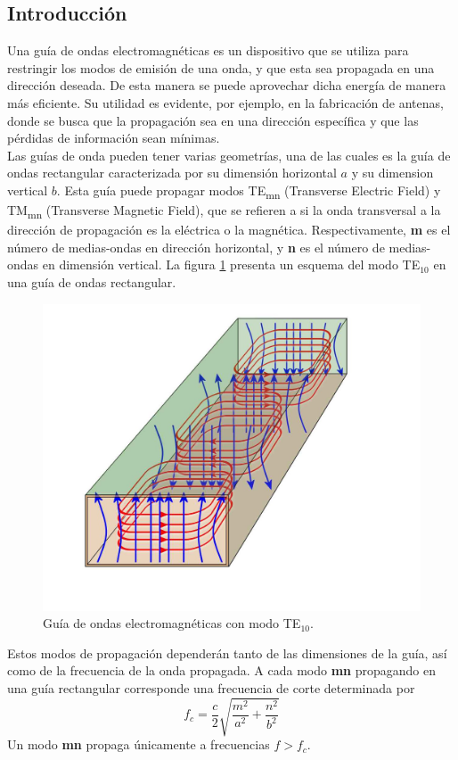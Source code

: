 \documentclass[11pt,a4paper]{article}
\begin{document}
\begin{multicols}{2}
\section{Introducción}
Una guía de ondas electromagnéticas es un dispositivo que se utiliza para restringir los modos de emisión de una onda, y que esta sea propagada en una dirección deseada. De esta manera se puede aprovechar dicha energía de manera más eficiente. Su utilidad es evidente, por ejemplo, en la fabricación de antenas, donde se busca que la propagación sea en una dirección específica y que las pérdidas de información sean mínimas. \\

Las guías de onda pueden tener varias geometrías, una de las cuales es la guía de ondas rectangular caracterizada por su dimensión horizontal $a$ y su dimension vertical $b$. Esta guía puede propagar modos TE\textsubscript{mn} (Transverse Electric Field) y TM\textsubscript{mn} (Transverse Magnetic Field), que se refieren a si la onda transversal a la dirección de propagación es la eléctrica o la magnética. 
Respectivamente, \textbf{m} es el número de medias-ondas en dirección horizontal, y \textbf{n} es el número de medias-ondas en dimensión vertical. 
La figura \ref{fig:te10} presenta un esquema del modo TE$_{10}$ en una guía de ondas rectangular.
\begin{figure}[H]
    \centering
    \includegraphics[scale=0.15]{Images/TE10.jpg}
    \caption{Guía de ondas electromagnéticas con modo TE$_{10}$.}
    \label{fig:te10}
\end{figure}
Estos modos de propagación dependerán tanto de las dimensiones de la guía, así como de la frecuencia de la onda propagada. 
A cada modo \textbf{mn} propagando en una guía rectangular corresponde una frecuencia de corte determinada por
\begin{equation}
    f_c = \frac{c}{2}\sqrt{\frac{m^2}{a^2}+\frac{n^2}{b^2}}
\end{equation}
Un modo \textbf{mn} propaga únicamente a frecuencias $f>f_c$.\\


\end{multicols}
\end{document}
